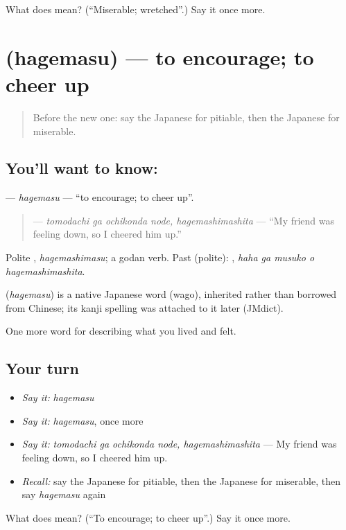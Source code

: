 \begin{tcolorbox}[breakable,colback=teal!4,colframe=teal!35!black,title={Before you move on}]
What does  mean? (\textquotedblleft{}Miserable; wretched\textquotedblright{}.) Say it once more.
\end{tcolorbox}
\section[\texorpdfstring{\ja{はげます} (hagemasu)}{はげます (hagemasu)}]{ (hagemasu) — to encourage; to cheer up}

\label{lesson:JA-C434-hagemasu}



\begin{quote}
Before the new one: say the Japanese for pitiable, then the Japanese for miserable.
\end{quote}

\subsection*{You'll want to know: }
\textbf{} — \emph{hagemasu} — \textquotedblleft{}to encourage; to cheer up\textquotedblright{}.

\begin{quote}
\textbf{ } — \emph{tomodachi ga ochikonda node, hagemashimashita} — \textquotedblleft{}My friend was feeling down, so I cheered him up.\textquotedblright{}
\end{quote}

Polite \textbf{}, \emph{hagemashimasu}; a godan verb. Past (polite): \textbf{  }, \emph{haha ga musuko o hagemashimashita}.

\begin{cousinweb}
\textbf{} (\emph{hagemasu}) is a native Japanese word (wago), inherited rather than borrowed from Chinese; its kanji spelling was attached to it later (JMdict).
\end{cousinweb}

\begin{grammarlens}[title={What you've built}]
One more word for describing what you lived and felt.
\end{grammarlens}

\subsection*{Your turn}
\begin{itemize}
\raggedright
  \item \emph{Say it:} \emph{hagemasu}
  \item \emph{Say it:} \emph{hagemasu}, once more
  \item \emph{Say it:} \emph{tomodachi ga ochikonda node, hagemashimashita} — My friend was feeling down, so I cheered him up.
  \item \emph{Recall:} say the Japanese for pitiable, then the Japanese for miserable, then say \emph{hagemasu} again
\end{itemize}

\begin{tcolorbox}[breakable,colback=teal!4,colframe=teal!35!black,title={Before you move on}]
What does  mean? (\textquotedblleft{}To encourage; to cheer up\textquotedblright{}.) Say it once more.
\end{tcolorbox}
